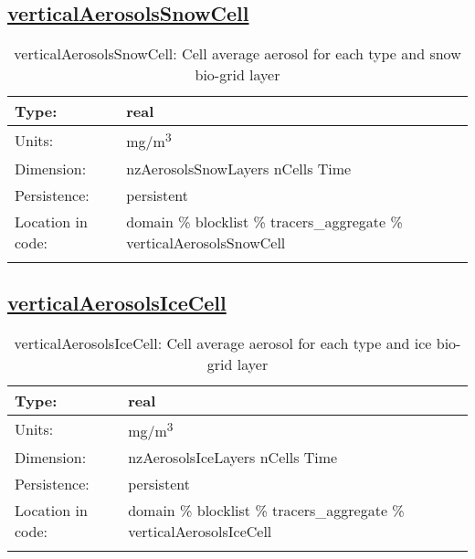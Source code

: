 \subsection[verticalAerosolsSnowCell]{\hyperref[sec:var_tab_tracers_aggregate]{verticalAerosolsSnowCell}}
\label{subsec:var_sec_tracers_aggregate_verticalAerosolsSnowCell}
\begin{center}
\begin{longtable}{| p{2.0in} | p{4.0in} |}
        \hline 
        Type: & real \\
        \hline 
        Units: & \si{mg/m^3} \\
        \hline 
        Dimension: & nzAerosolsSnowLayers nCells Time \\
        \hline 
        Persistence: & persistent \\
        \hline 
         Location in code: & domain \% blocklist \% tracers\_aggregate \% verticalAerosolsSnowCell \\
         \hline 
    \caption{verticalAerosolsSnowCell: Cell average aerosol for each type and snow bio-grid layer}
\end{longtable}
\end{center}
\subsection[verticalAerosolsIceCell]{\hyperref[sec:var_tab_tracers_aggregate]{verticalAerosolsIceCell}}
\label{subsec:var_sec_tracers_aggregate_verticalAerosolsIceCell}
\begin{center}
\begin{longtable}{| p{2.0in} | p{4.0in} |}
        \hline 
        Type: & real \\
        \hline 
        Units: & \si{mg/m^3} \\
        \hline 
        Dimension: & nzAerosolsIceLayers nCells Time \\
        \hline 
        Persistence: & persistent \\
        \hline 
         Location in code: & domain \% blocklist \% tracers\_aggregate \% verticalAerosolsIceCell \\
         \hline 
    \caption{verticalAerosolsIceCell: Cell average aerosol for each type and ice bio-grid layer}
\end{longtable}
\end{center}
